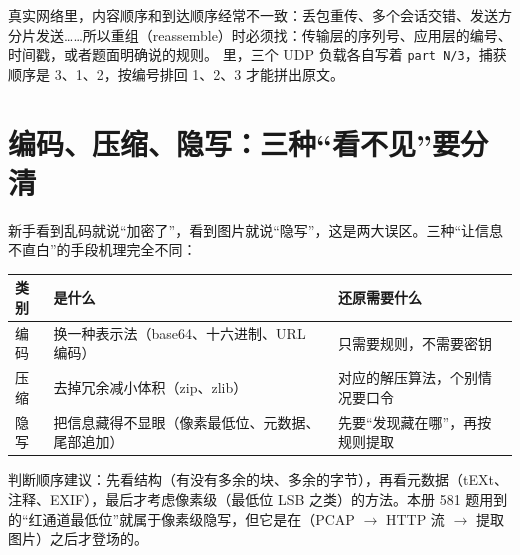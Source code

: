 \documentclass[UTF8,12pt,oneside]{ctexbook}
\begin{document}
真实网络里，内容顺序和到达顺序经常不一致：丢包重传、多个会话交错、发送方分片发送……所以重组（reassemble）时必须找：传输层的序列号、应用层的编号、时间戳，或者题面明确说的规则。 里，三个 UDP 负载各自写着 \verb|part N/3|，捕获顺序是 3、1、2，按编号排回 1、2、3 才能拼出原文。

\section{编码、压缩、隐写：三种“看不见”要分清}
新手看到乱码就说“加密了”，看到图片就说“隐写”，这是两大误区。三种“让信息不直白”的手段机理完全不同：
\begin{center}
\begin{tabular}{p{}p{}p{}}
\toprule
类别 & 是什么 & 还原需要什么 \\
\midrule
编码 & 换一种表示法（base64、十六进制、URL 编码） & 只需要规则，不需要密钥 \\
压缩 & 去掉冗余减小体积（zip、zlib） & 对应的解压算法，个别情况要口令 \\
隐写 & 把信息藏得不显眼（像素最低位、元数据、尾部追加） & 先要“发现藏在哪”，再按规则提取 \\
\bottomrule
\end{tabular}
\end{center}
判断顺序建议：先看结构（有没有多余的块、多余的字节），再看元数据（tEXt、注释、EXIF），最后才考虑像素级（最低位 LSB 之类）的方法。本册 581 题用到的“红通道最低位”就属于像素级隐写，但它是在（PCAP $\rightarrow$ HTTP 流 $\rightarrow$ 提取图片）之后才登场的。
\end{document}
